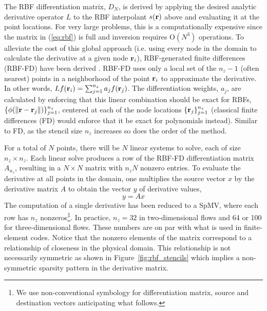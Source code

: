 \documentclass[10pt,conference,compsocconf]{IEEEtran}
\begin{document}
The RBF differentiation matrix, $D_N$, is derived by applying the
desired analytic derivative operator $L$ to the RBF interpolant
$s({\bf r})$ above and evaluating it at the point locations. For very
large problems, this is a computationally expensive since the matrix
in (\ref{eq:rbf}) is full and inversion requires O$(N^3)$
operations. To alleviate the cost of this global approach (i.e. using
every node in the domain to calculate the derivative at a given node
${\bf r}_i$), RBF-generated finite differences (RBF-FD) have been
derived \cite{TAI1,TAI2,SDY02,WrFo06,FoL11,FLBWSC12}. RBF-FD uses only
a local set of the $n_z-1$  (often nearest) points in a neighborhood of 
the point ${\bf r}_i$ to
approximate the derivative. In other words,
$Lf({\bf r}_i)=\sum_{j=1}^{n_z}a_jf({\bf r}_j)$. The differentiation
weights, $a_j$, are calculated by enforcing that this linear
combination should be exact for RBFs,
$\{\phi(\|{\bf r}-{\bf r}_{j}\|)\}_{j=1}^{n_z}$, centered at each of the
node locations $\{{\bf r}_j\}_{j=1}^{n_z}$ (classical finite differences
(FD) would enforce that it be exact for polynomials instead). Similar
to FD, as the stencil size $n_z$ increases so does the order of the
method.

For a total of $N$ points, there will be $N$ linear systems to solve,
each of size $n_z \times n_z$. Each linear solve produces a row of the
RBF-FD differentiation matrix $A_{n_z}$, resulting in a $N \times N$
matrix with $n_zN$ nonzero entries. To evaluate the derivative at all
points in the domain, one multiplies the source vector $x$ by the 
derivative matrix $A$ to obtain the vector $y$ of derivative values, 
$$
  y = A x
$$
The computation of a single derivative has been reduced to a SpMV, 
where each row has $n_z$ nonzeros\footnote{We use non-conventional 
symbology for differentiation matrix, source and destination vectors
anticipating what follows.}. 
In practice, $n_z=32$ in two-dimensional flows and 64 or 100 for
three-dimensional flows. These numbers are on par with what is used in
finite-element codes. Notice that the nonzero elements of the matrix
correspond to a relationship of closeness in the physical domain. 
This relationship is not
necessarily symmetric as shown in Figure~\ref{fig:rbf_stencils} which
implies a non-symmetric sparsity pattern in the derivative matrix. 
\end{document}
